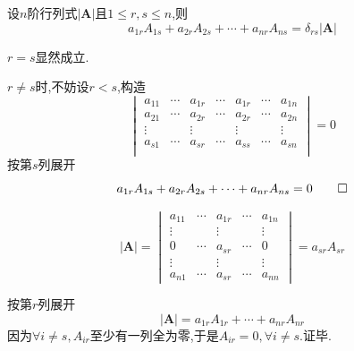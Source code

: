 \begin{formal}
\begin{theorem}[异乘变零定理]\label{thm:异乘变零定理}
    设$n$阶行列式$\left|\bm{A}\right|$且$1\leqslant r,s\leqslant n$,则
    \[
    a_{1r}A_{1s}+a_{2r}A_{2s}+\cdots+a_{nr}A_{ns}=\delta_{rs}\left|\bm{A}\right|
    \]
\end{theorem}
\begin{Proof}
$r=s$显然成立.

$r\neq s$时,不妨设$r<s$,构造
\[
\begin{vmatrix}
    a_{11}&\cdots&a_{1r}&\cdots&a_{1r}&\cdots&a_{1n}\\
    a_{21}&\cdots&a_{2r}&\cdots&a_{2r}&\cdots&a_{2n}\\
    \vdots& &\vdots& &\vdots& &\vdots\\
    a_{s1}&\cdots&a_{sr}&\cdots&a_{ss}&\cdots&a_{sn}\\
\end{vmatrix}=0
\]按第$s$列展开\[
a_{1r}A_{1s}+a_{2r}A_{2s}+\cdots+a_{nr}A_{ns}=0\qedhere
\]
\end{Proof}
\end{formal}
\begin{green}
\begin{lemma}[单元行展开]\label{lemma:单元行展开}
    \[
    \left|\bm{A}\right|=\begin{vmatrix}
        a_{11}&\cdots&a_{1r}&\cdots&a_{1n}\\
        \vdots& &\vdots&&\vdots\\
        0&\cdots&a_{sr}&\cdots&0\\
        \vdots& &\vdots&&\vdots\\
        a_{n1}&\cdots&a_{sr}&\cdots&a_{nn}
    \end{vmatrix}=a_{sr}A_{sr}
    \]
\end{lemma}
\begin{Proof}
按第$r$列展开\[
\left|\bm{A}\right|=a_{1r}A_{1r}+\cdots+a_{nr}A_{nr}
\]因为$\forall i\neq s,A_{ir}$至少有一列全为零,于是$A_{ir}=0,\forall i\neq s.$证毕.
\end{Proof}
\end{green}
